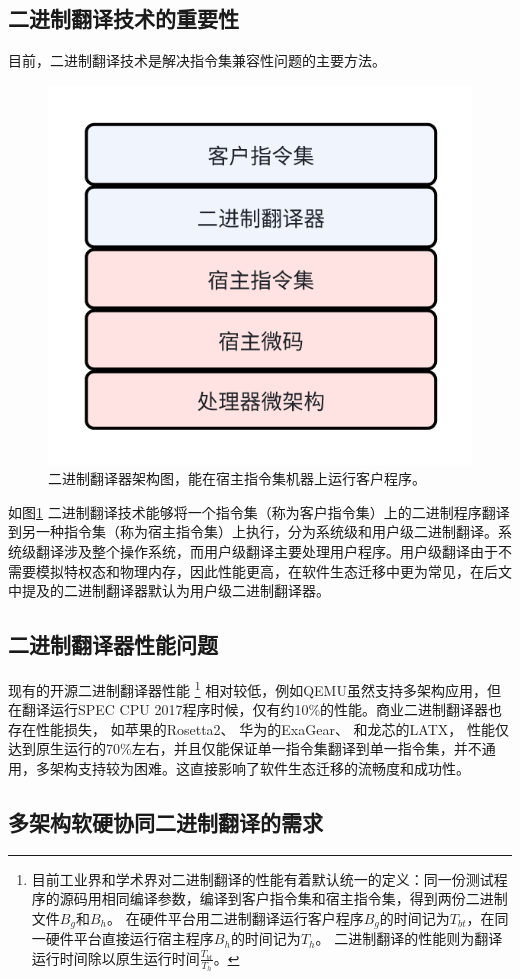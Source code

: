 \documentclass{Style/ucasproposal}%
\begin{document}
\subsection{二进制翻译技术的重要性}
目前，二进制翻译技术是解决指令集兼容性问题的主要方法。

\begin{figure}[h]
    \centering
    \includegraphics[width=0.3\linewidth]{./feishuImage/BT_arch.png}
    \caption{二进制翻译器架构图，能在宿主指令集机器上运行客户程序。}
    \label{img:BT_arch}
  \end{figure}

如图\ref{img:BT_arch} 二进制翻译技术能够将一个指令集（称为客户指令集）上的二进制程序翻译到另一种指令集（称为宿主指令集）上执行，分为系统级和用户级二进制翻译。系统级翻译涉及整个操作系统，而用户级翻译主要处理用户程序。用户级翻译由于不需要模拟特权态和物理内存，因此性能更高，在软件生态迁移中更为常见，在后文中提及的二进制翻译器默认为用户级二进制翻译器。

\subsection{二进制翻译器性能问题}
现有的开源二进制翻译器性能
\footnote{
    目前工业界和学术界对二进制翻译的性能有着默认统一的定义：同一份测试程序的源码用相同编译参数，编译到客户指令集和宿主指令集，得到两份二进制文件$B_g$和$B_h$。
    在硬件平台用二进制翻译运行客户程序$B_g$的时间记为$T_{bt}$，在同一硬件平台直接运行宿主程序$B_h$的时间记为$T_h$。
    二进制翻译的性能则为翻译运行时间除以原生运行时间$\frac{T_{bt}}{T_h}$。
}
相对较低，例如QEMU\cite{bellardQEMUFastPortable2005}虽然支持多架构应用，但在翻译运行SPEC CPU 2017\cite{SPECCPU2017}程序时候，仅有约10\%的性能。商业二进制翻译器也存在性能损失，
如苹果的Rosetta2\cite{RosettaTranslationEnvironment, RunningIntelBinaries}、
华为的ExaGear\cite{KunPengExaGear}、
和龙芯的LATX\cite{LoongArchEnv2022, LoongArch2023}，
性能仅达到原生运行的70\%左右，并且仅能保证单一指令集翻译到单一指令集，并不通用，多架构支持较为困难。这直接影响了软件生态迁移的流畅度和成功性。

\subsection{多架构软硬协同二进制翻译的需求}
\end{document}
